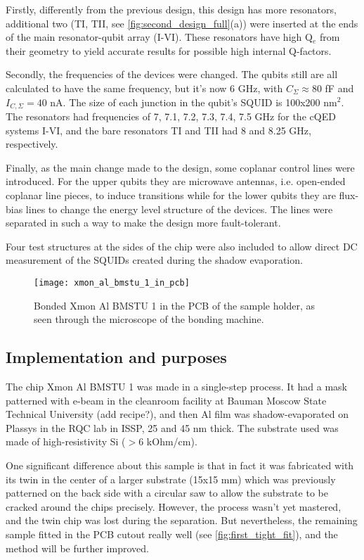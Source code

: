 \documentclass[12pt, twoside]{report}
\numberwithin{equation}{section}
\begin{document}
Firstly, differently from the previous design, this design has more resonators, additional two (TI, TII, see \autoref{fig:second_design_full}(a)) were inserted at the ends of the main resonator-qubit array (I-VI). These resonators have high Q$_e$ from their geometry to yield accurate results for possible high internal Q-factors.

Secondly, the frequencies of the devices were changed. The qubits still are all calculated to have the same frequency, but it's now 6 GHz, with $C_\Sigma \approx 80$ fF and $I_{C, \Sigma} = 40$ nA. The size of each junction in the qubit's SQUID is 100x200 nm$^2$. The resonators had frequencies of 7, 7.1, 7.2, 7.3, 7.4, 7.5 GHz for the cQED systems I-VI, and the bare resonators TI and TII had 8 and 8.25 GHz, respectively.

Finally, as the main change made to the design, some coplanar control lines were introduced. For the upper qubits they are microwave antennas, i.e. open-ended coplanar line pieces, to induce transitions while for the lower qubits they are flux-bias lines to change the energy level structure of the devices. The lines were separated in such a way to make the design more fault-tolerant.

Four test structures at the sides of the chip were also included to allow direct DC measurement of the SQUIDs created during the shadow evaporation.


\begin{figure}
\centering
\texttt{[image: xmon\_al\_bmstu\_1\_in\_pcb]}
\caption{Bonded Xmon Al BMSTU 1 in the PCB of the sample holder, as seen through the microscope of the bonding machine.}
\label{fig:first_tight_fit}
\end{figure}

\subsection{Implementation and purposes}

The chip Xmon Al BMSTU 1 was made in a single-step process. It had a mask patterned with e-beam in the cleanroom facility at Bauman Moscow State Technical University (add recipe?), and then Al film was shadow-evaporated on Plassys in the RQC lab in ISSP, 25 and 45 nm thick. The substrate used was made of high-resistivity Si ($> 6$ kOhm/cm).

One significant difference about this sample is that in fact it was fabricated with its twin in the center of a larger substrate (15x15 mm) which was previously patterned on the back side with a circular saw to allow the substrate to be cracked around the chips precisely. However, the process wasn't yet mastered, and the twin chip was lost during the separation. But nevertheless, the remaining sample fitted in the PCB cutout really well (see \autoref{fig:first_tight_fit}), and the method will be further improved.
\end{document}
